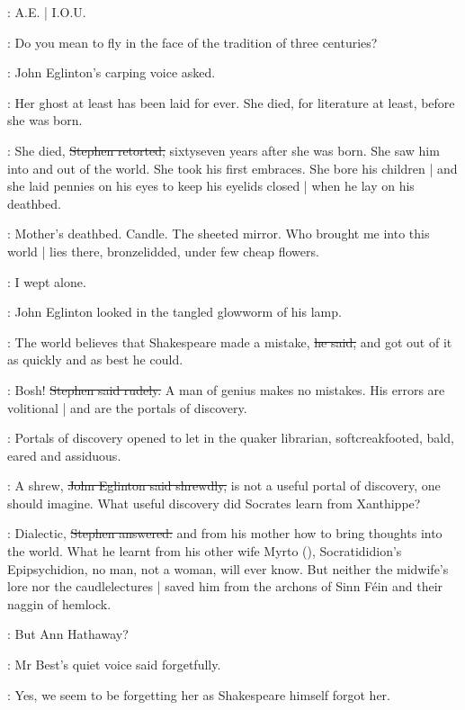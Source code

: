\StephenInt:
A.E. |
I.O.U.

\eglinton:
Do you mean to fly in the face of the tradition of three centuries?

:
John Eglinton's carping voice asked.

\eglinton:
Her ghost at least has been laid for ever.
She died,
for literature at least,
before she was born.

\Stephen:
She died,
\sout{Stephen retorted,}
sixtyseven years after she was born.
She saw him into and out of the world.
She took his first embraces.
She bore his children |
and she laid pennies on his eyes to keep his eyelids closed |
when he lay
on his deathbed.

\StephenInt:
Mother's deathbed.
Candle.
The sheeted mirror.
Who brought me into this world |
lies there,
bronzelidded,
under few cheap flowers.

\StephenInt:
I wept alone.



:
John Eglinton looked in the tangled glowworm of his lamp.

\eglinton:
The world believes that Shakespeare made a mistake,
\sout{he said,}
and got out of it as quickly and as best he could.

\Stephen:
Bosh!
\sout{Stephen said rudely.}
A man of genius makes no mistakes.
His errors are volitional |
and are the portals of discovery.

:
Portals of discovery opened
to let in the quaker librarian,
softcreakfooted, bald, eared and assiduous.

\eglinton:
A shrew,
\sout{John Eglinton said shrewdly,}
is not a useful portal of discovery,
one should imagine.
What useful discovery did Socrates learn from Xanthippe?

\Stephen:
Dialectic,
\sout{Stephen answered:}
and from his mother how to bring thoughts into the world.
What he learnt from his other wife Myrto (),
Socratididion's Epipsychidion,
no man, not a woman, will ever know.
But neither the midwife's lore nor the caudlelectures |
saved him from the archons of Sinn Féin and their naggin of hemlock.

\best:
But Ann Hathaway?

:
Mr Best's quiet voice said forgetfully.

\best:
Yes,
we seem to be forgetting her as Shakespeare himself forgot her.

